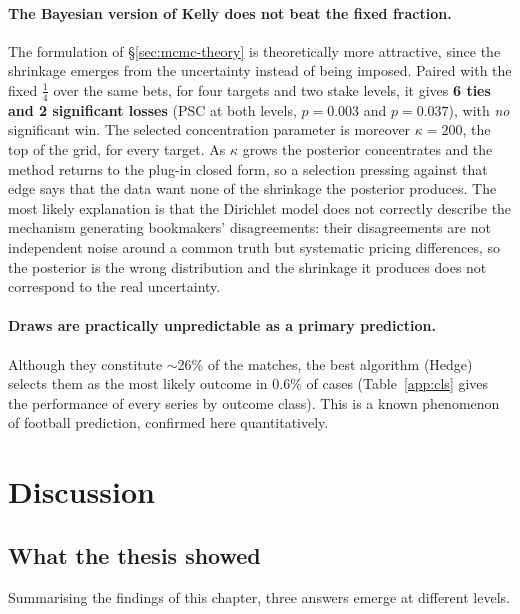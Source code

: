 \documentclass[12pt,a4paper,oneside]{report}
\renewcommand{\_}{\oldunderscore\allowbreak}
\theoremstyle{definition}
\theoremstyle{plain}
\theoremstyle{definition}   %
\begin{document}
\paragraph{The Bayesian version of Kelly does not beat the fixed fraction.} The formulation of
\S\ref{sec:mcmc-theory} is theoretically more attractive, since the shrinkage emerges from the
uncertainty instead of being imposed. Paired with the fixed $\tfrac14$ over the same bets, for
four targets and two stake levels, it gives \textbf{6 ties and 2 significant losses} (PSC at both
levels, $p=0.003$ and $p=0.037$), with \emph{no} significant win. The selected concentration
parameter is moreover $\kappa=200$, the top of the grid, for every target. As $\kappa$ grows the
posterior concentrates and the method returns to the plug-in closed form, so a selection pressing
against that edge says that the data want none of the shrinkage the posterior produces. The most likely explanation is that the Dirichlet model does not
correctly describe the mechanism generating bookmakers' disagreements: their disagreements are not
independent noise around a common truth but systematic pricing differences, so the posterior is
the wrong distribution and the shrinkage it produces does not correspond to the real uncertainty.

\paragraph{Draws are practically unpredictable as a primary prediction.} Although they constitute
$\sim$26\% of the matches, the best algorithm (Hedge) selects them as the most likely outcome in
$0.6\%$ of cases (Table~\ref{app:cls} gives the performance of every series by outcome class). This is a
known phenomenon of football prediction, confirmed here quantitatively.

\section{Discussion}
\label{sec:discussion}

\subsection{What the thesis showed}

Summarising the findings of this chapter, three answers emerge at different levels.
\end{document}
